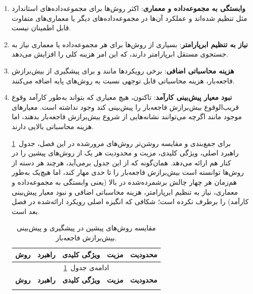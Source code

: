\documentclass[11pt]{article}
\begin{document}
\begin{enumerate}

\item
\textbf{وابستگی به مجموعه‌داده و معماری}:
اکثر روش‌ها برای مجموعه‌داده‌های استاندارد مثل  تنظیم شده‌اند
و عملکرد آن‌ها در مجموعه‌داده‌های دیگر یا معماری‌های متفاوت قابل اطمینان نیست.

\item
\textbf{نیاز به تنظیم ابرپارامتر}:
بسیاری از روش‌ها برای هر مجموعه‌داده یا معماری نیاز به جستجوی مستقل ابرپارامتر دارند،
که این امر هزینه‌ کلی را افزایش می‌دهد.

\item
\textbf{هزینه‌ محاسباتی اضافی}:
برخی رویکردها مانند  و  برای پیشگیری از بیش‌برازش فاجعه‌بار، هزینه‌ محاسباتی قابل توجهی نسبت به روش‌های پایه اضافه می‌کنند.

\item
\textbf{نبود معیار پیش‌بینی کارآمد}:
تاکنون، هیچ معیاری که بتواند به‌طور کارآمد وقوع قریب‌الوقوع بیش‌برازش فاجعه‌بار را پیش‌بینی کند وجود نداشته است.
معیارهای موجود مانند  اگرچه می‌توانند نشانه‌هایی از شروع بیش‌برازش فاجعه‌بار بدهند،
اما هزینه‌ محاسباتی بالایی دارند.

برای جمع‌بندی و مقایسه‌ روشن‌تر روش‌های مرورشده در این فصل،
جدول~\ref{tab:comparison_prior_works} راهبرد اصلی، ویژگی کلیدی، مزیت و محدودیت هر یک از روش‌های پیشین را
در کنار هم ارائه می‌دهد. همان‌گونه که از این جدول برمی‌آید، هرچند هر دسته از روش‌ها
توانسته است بیش‌برازش فاجعه‌بار را تا حدی مهار کند، اما هیچ‌یک به‌طور هم‌زمان
هر چهار چالش برشمرده‌شده در بالا 
(یعنی وابستگی به مجموعه‌داده و معماری، نیاز به تنظیم ابرپارامتر، هزینه‌ محاسباتی اضافی و نبود معیار پیش‌بینی کارآمد)
را برطرف نکرده است؛
شکافی که انگیزه‌ اصلی رویکرد ارائه‌شده در فصل بعد است.


{\small
\renewcommand{\arraystretch}{1.3} %
\setlength{\tabcolsep}{8pt} %
\begin{longtable}{|p{2.2cm}|p{2cm}|p{3.2cm}|p{3.2cm}|p{3.2cm}|} %
\caption{مقایسه‌ روش‌های پیشین در پیشگیری و پیش‌بینی بیش‌برازش فاجعه‌بار.}
\label{tab:comparison_prior_works} \\
\hline
\textbf{روش} & \textbf{راهبرد} & \textbf{ویژگی کلیدی} & \textbf{مزیت} & \textbf{محدودیت} \\
\hline
\endfirsthead
\multicolumn{5}{c}{\small ادامه‌ی جدول~\ref{tab:comparison_prior_works}} \\
\hline
\textbf{روش} & \textbf{راهبرد} & \textbf{ویژگی کلیدی} & \textbf{مزیت} & \textbf{محدودیت} \\
\hline
\endhead
\hline
\endfoot


\end{longtable}}
\end{enumerate}
\end{document}
